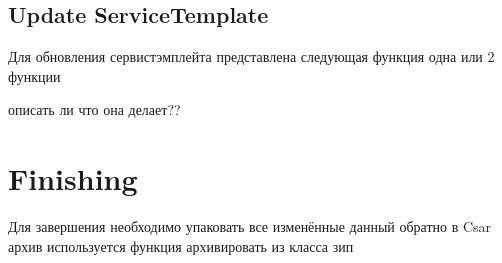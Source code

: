 \subsection*{Update ServiceTemplate}
Для обновления сервистэмплейта представлена следующая функция 
одна или 2 функции

описать ли что она делает??

\fi
\section{Finishing}
Для завершения необходимо упаковать все изменённые данный обратно в Csar архив
используется функция архивировать из класса зип

\fi